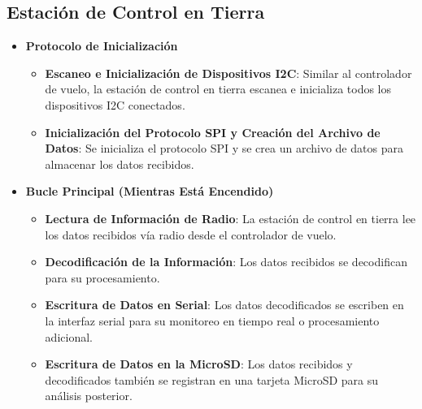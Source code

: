     \subsection{Estación de Control en Tierra}
        \begin{itemize}
            \item \textbf{Protocolo de Inicialización}
            \begin{itemize}
                \item \textbf{Escaneo e Inicialización de Dispositivos I2C}: Similar al controlador de vuelo, la estación de control en tierra escanea e inicializa todos los dispositivos I2C conectados.
                \item \textbf{Inicialización del Protocolo SPI y Creación del Archivo de Datos}: Se inicializa el protocolo SPI y se crea un archivo de datos para almacenar los datos recibidos.
            \end{itemize}
           
            \item \textbf{Bucle Principal (Mientras Está Encendido)}
            \begin{itemize}
                \item \textbf{Lectura de Información de Radio}: La estación de control en tierra lee los datos recibidos vía radio desde el controlador de vuelo.
                \item \textbf{Decodificación de la Información}: Los datos recibidos se decodifican para su procesamiento.
                \item \textbf{Escritura de Datos en Serial}: Los datos decodificados se escriben en la interfaz serial para su monitoreo en tiempo real o procesamiento adicional.
                \item \textbf{Escritura de Datos en la MicroSD}: Los datos recibidos y decodificados también se registran en una tarjeta MicroSD para su análisis posterior.
            \end{itemize}
        \end{itemize}
